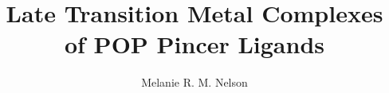 \documentclass[12pt, a4paper, twoside, openright]{book}
\begin{document}
\frontmatter


\title{Late Transition Metal Complexes of POP Pincer Ligands}
\author{Melanie R. M. Nelson}

\subject{Chemistry}

\phd







\maketitle



\tableofcontents
\printglossaries


\mainmatter














%
%

\end{document}
